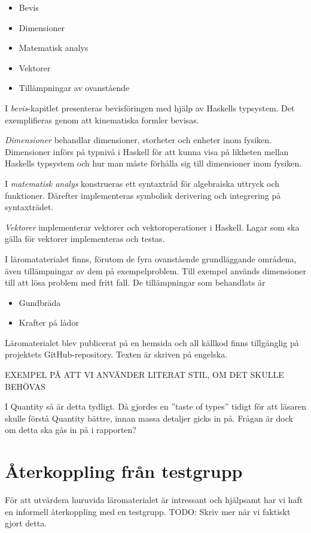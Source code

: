 \begin{draft}
\begin{itemize}
  \item Bevis
  \item Dimensioner
  \item Matematisk analys
  \item Vektorer
  \item Tillämpningar av ovanstående
\end{itemize}

I \textit{bevis}-kapitlet presenteras bevisföringen med hjälp av Haskells typsystem. Det exemplifieras genom att kinematiska formler bevisas.

\textit{Dimensioner} behandlar dimensioner, storheter och enheter inom fysiken. Dimensioner införs på typnivå i Haskell för att kunna visa på likheten mellan Haskells typsystem och hur man måste förhålla sig till dimensioner inom fysiken.

I \textit{matematisk analys} konstrueras ett syntaxträd för algebraiska uttryck och funktioner. Därefter implementeras symbolisk derivering och integrering på syntaxträdet.

\textit{Vektorer} implementerar vektorer och vektoroperationer i Haskell. Lagar som ska gälla för vektorer implementeras och testas.

I läromataterialet finns, förutom de fyra ovanstående grundläggande områdena, även tillämpningar av dem på exempelproblem. Till exempel används dimensioner till att lösa problem med fritt fall. De tillämpningar som behandlats är

\begin{itemize}
  \item Gundbräda
  \item Krafter på lådor
\end{itemize}

Läromaterialet blev publicerat på en hemsida\cite{LYAP} och all källkod finns tillgänglig på projektets GitHub-repository.\cite{LYAP_repo} Texten är skriven på engelska.

\end{draft}

\begin{binge}

EXEMPEL PÅ ATT VI ANVÄNDER LITERAT STIL, OM DET SKULLE BEHÖVAS

I Quantity så är detta tydligt. Då gjordes en ''taste of types'' tidigt för att läsaren skulle förstå Quantity bättre, innan massa detaljer gicks in på. Frågan är dock om detta ska gås in på i rapporten?

\section{Återkoppling från testgrupp}

För att utvärdera huruvida läromaterialet är intressant och hjälpsamt har vi
haft en informell återkoppling med en testgrupp. TODO: Skriv mer när vi
faktiskt gjort detta.

\end{binge}
